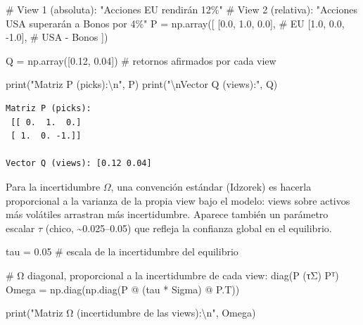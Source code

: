 \documentclass[
  spanish,
  letterpaper,
  DIV=11,
  numbers=noendperiod]{scrreprt}
\newenvironment{Shaded}{\begin{snugshade}}{\end{snugshade}}
\newcommand{\BuiltInTok}[1]{\textcolor[rgb]{0.00,0.23,0.31}{#1}}
\newcommand{\CharTok}[1]{\textcolor[rgb]{0.13,0.47,0.30}{#1}}
\newcommand{\CommentTok}[1]{\textcolor[rgb]{0.37,0.37,0.37}{#1}}
\newcommand{\FloatTok}[1]{\textcolor[rgb]{0.68,0.00,0.00}{#1}}
\newcommand{\NormalTok}[1]{\textcolor[rgb]{0.00,0.23,0.31}{#1}}
\newcommand{\OperatorTok}[1]{\textcolor[rgb]{0.37,0.37,0.37}{#1}}
\newcommand{\StringTok}[1]{\textcolor[rgb]{0.13,0.47,0.30}{#1}}
\begin{document}
\label{views}
\begin{Shaded}
\begin{Highlighting}[]
\CommentTok{\# View 1 (absoluta): "Acciones EU rendirán 12\%"}
\CommentTok{\# View 2 (relativa): "Acciones USA superarán a Bonos por 4\%"}
\NormalTok{P }\OperatorTok{=}\NormalTok{ np.array([}
\NormalTok{    [}\FloatTok{0.0}\NormalTok{, }\FloatTok{1.0}\NormalTok{,  }\FloatTok{0.0}\NormalTok{],   }\CommentTok{\# EU}
\NormalTok{    [}\FloatTok{1.0}\NormalTok{, }\FloatTok{0.0}\NormalTok{, }\OperatorTok{{-}}\FloatTok{1.0}\NormalTok{],   }\CommentTok{\# USA {-} Bonos}
\NormalTok{])}

\NormalTok{Q }\OperatorTok{=}\NormalTok{ np.array([}\FloatTok{0.12}\NormalTok{, }\FloatTok{0.04}\NormalTok{])   }\CommentTok{\# retornos afirmados por cada view}

\BuiltInTok{print}\NormalTok{(}\StringTok{"Matriz P (picks):}\CharTok{\textbackslash{}n}\StringTok{"}\NormalTok{, P)}
\BuiltInTok{print}\NormalTok{(}\StringTok{"}\CharTok{\textbackslash{}n}\StringTok{Vector Q (views):"}\NormalTok{, Q)}
\end{Highlighting}
\end{Shaded}

\begin{verbatim}
Matriz P (picks):
 [[ 0.  1.  0.]
 [ 1.  0. -1.]]

Vector Q (views): [0.12 0.04]
\end{verbatim}

Para la incertidumbre \(\Omega\), una convención estándar (Idzorek) es
hacerla proporcional a la varianza de la propia view bajo el modelo:
views sobre activos más volátiles arrastran más incertidumbre. Aparece
también un parámetro escalar \(\tau\) (chico,
\textasciitilde0.025--0.05) que refleja la confianza global en el
equilibrio.

\label{omega}
\begin{Shaded}
\begin{Highlighting}[]
\NormalTok{tau }\OperatorTok{=} \FloatTok{0.05}   \CommentTok{\# escala de la incertidumbre del equilibrio}

\CommentTok{\# Ω diagonal, proporcional a la incertidumbre de cada view: diag(P (τΣ) Pᵀ)}
\NormalTok{Omega }\OperatorTok{=}\NormalTok{ np.diag(np.diag(P }\OperatorTok{@}\NormalTok{ (tau }\OperatorTok{*}\NormalTok{ Sigma) }\OperatorTok{@}\NormalTok{ P.T))}

\BuiltInTok{print}\NormalTok{(}\StringTok{"Matriz Ω (incertidumbre de las views):}\CharTok{\textbackslash{}n}\StringTok{"}\NormalTok{, Omega)}
\end{Highlighting}
\end{Shaded}
\end{document}
